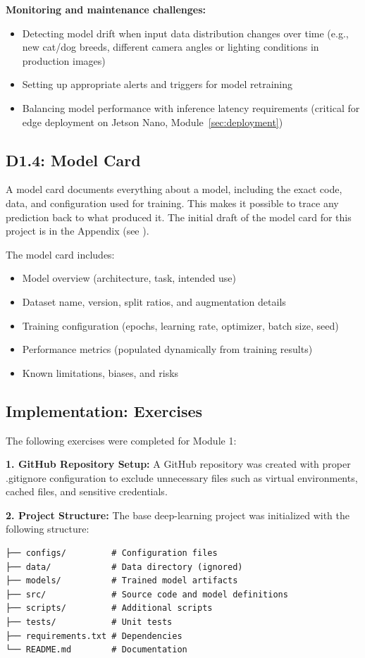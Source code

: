 \documentclass[10pt,twocolumn,letterpaper]{article}
\begin{document}
\textbf{Monitoring and maintenance challenges:}
\begin{itemize}
    \item Detecting model drift when input data distribution changes over time (e.g., new cat/dog breeds, different camera angles or lighting conditions in production images)
    \item Setting up appropriate alerts and triggers for model retraining
    \item Balancing model performance with inference latency requirements (critical for edge deployment on Jetson Nano, Module~\ref{sec:deployment})
\end{itemize}

\subsection{D1.4: Model Card}
A model card documents everything about a model, including the exact code, data, and configuration used for training. This makes it possible to trace any prediction back to what produced it. The initial draft of the model card for this project is in the Appendix (see ).

The model card includes:
\begin{itemize}
    \item Model overview (architecture, task, intended use)
    \item Dataset name, version, split ratios, and augmentation details
    \item Training configuration (epochs, learning rate, optimizer, batch size, seed)
    \item Performance metrics (populated dynamically from training results)
    \item Known limitations, biases, and risks
\end{itemize}

\subsection{Implementation: Exercises}
The following exercises were completed for Module 1:

\textbf{1. GitHub Repository Setup:}
A GitHub repository was created with proper .gitignore configuration to exclude unnecessary files such as virtual environments, cached files, and sensitive credentials.

\textbf{2. Project Structure:}
The base deep-learning project was initialized with the following structure:
\begin{verbatim}
├── configs/         # Configuration files
├── data/            # Data directory (ignored)
├── models/          # Trained model artifacts
├── src/             # Source code and model definitions
├── scripts/         # Additional scripts
├── tests/           # Unit tests
├── requirements.txt # Dependencies
└── README.md        # Documentation
\end{verbatim}
\end{document}
